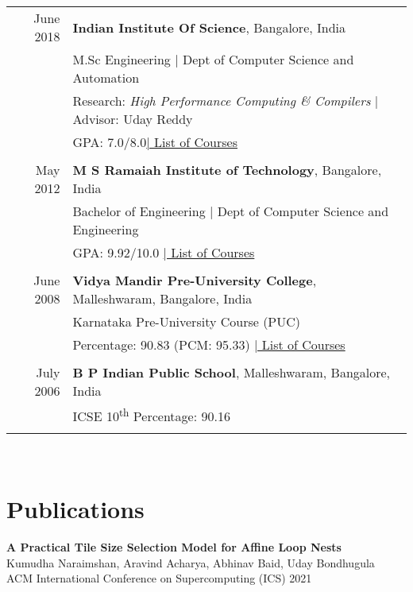 \documentclass[a4paper,10pt]{article} %
\begin{document}
\begin{tabular}{rp{13cm}}
June 2018 & \textbf{Indian Institute Of Science}, Bangalore, India\\
& M.Sc Engineering | Dept of Computer Science and Automation\\
& Research: \small\emph{High Performance Computing \& Compilers} | Advisor: Uday Reddy\\
&\normalsize GPA: 7.0/8.0\hyperlink{iisc}{\hfill | \footnotesize List of Courses}\\
&\\


May 2012 & \textbf{M S Ramaiah Institute of Technology}, Bangalore, India\\
& Bachelor of Engineering | Dept of Computer Science and Engineering \\
&\normalsize GPA: 9.92/10.0 \hyperlink{msrit}{\hfill| \footnotesize List of Courses}\\
&\\


June 2008 & \textbf{Vidya Mandir Pre-University College}, Malleshwaram, Bangalore, India\\
& Karnataka Pre-University Course (PUC) \\
&\normalsize Percentage: 90.83 (PCM: 95.33) \hyperlink{hs}{\hfill| 
\footnotesize List of Courses}\\
&\\


July 2006 & \textbf{B P Indian Public School}, Malleshwaram, Bangalore, India\\
& ICSE 10\textsuperscript{th} \normalsize Percentage: 90.16 \\
&\\
\end{tabular}
\\
\section{Publications}
\textbf{A Practical Tile Size Selection Model for Affine Loop Nests} \\
\small{Kumudha Naraimshan, Aravind Acharya, Abhinav Baid, Uday Bondhugula} \\
\small{ACM International Conference on Supercomputing (ICS) 2021}
\end{document}
